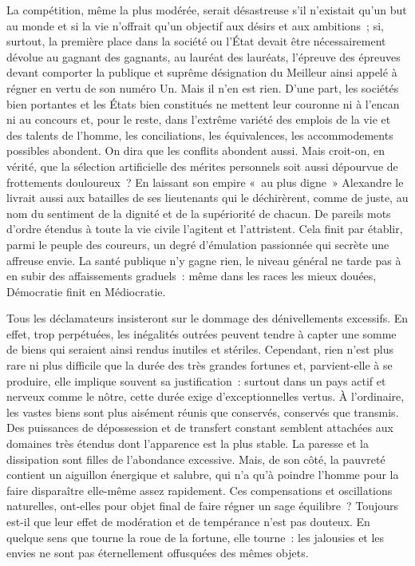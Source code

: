 \documentclass[french,twoside]{book} %
\begin{document}
La compétition, même la plus modérée, serait désastreuse s’il n’existait qu’un but au monde et si la vie n’offrait qu’un objectif aux désirs et aux ambitions ; si, surtout, la première place dans la société ou l’État devait être nécessairement dévolue au gagnant des gagnants, au lauréat des lauréats, l’épreuve des épreuves devant comporter la publique et suprême désignation du Meilleur ainsi appelé à régner en vertu de son numéro Un. Mais il n’en est rien. D’une part, les sociétés bien portantes et les États bien constitués ne mettent leur couronne ni à l’encan ni au concours et, pour le reste, dans l’extrême variété des emplois de la vie et des talents de l’homme, les conciliations, les équivalences, les accommodements possibles abondent. On dira que les conflits abondent aussi. Mais croit-on, en vérité, que la sélection artificielle des mérites personnels soit aussi dépourvue de frottements douloureux ? En laissant son empire « au plus digne » Alexandre le livrait aussi aux batailles de ses lieutenants qui le déchirèrent, comme de juste, au nom du sentiment de la dignité et de la supériorité de chacun. De pareils mots d’ordre étendus à toute la vie civile l’agitent et l’attristent. Cela finit par établir, parmi le peuple des coureurs, un degré d’émulation passionnée qui secrète une affreuse envie. La santé publique n’y gagne rien, le niveau général ne tarde pas à en subir des affaissements graduels : même dans les races les mieux douées, Démocratie finit en Médiocratie.\par
Tous les déclamateurs insisteront sur le dommage des dénivellements excessifs. En effet, trop perpétuées, les inégalités outrées peuvent tendre à capter une somme de biens qui seraient ainsi rendus inutiles et stériles. Cependant, rien n’est plus rare ni plus difficile que la durée des très grandes fortunes et, parvient-elle à se produire, elle implique souvent sa justification : surtout dans un pays actif et nerveux comme le nôtre, cette durée exige d’exceptionnelles vertus. À l’ordinaire, les vastes biens sont plus aisément réunis que conservés, conservés que transmis. Des puissances de dépossession et de transfert constant semblent attachées aux domaines très étendus dont l’apparence est la plus stable. La paresse et la dissipation sont filles de l’abondance excessive. Mais, de son côté, la pauvreté contient un aiguillon énergique et salubre, qui n’a qu’à poindre l’homme pour la faire disparaître elle-même assez rapidement. Ces compensations et oscillations naturelles, ont-elles pour objet final de faire régner un sage équilibre ? Toujours est-il que leur effet de modération et de tempérance n’est pas douteux. En quelque sens que tourne la roue de la fortune, elle tourne : les jalousies et les envies ne sont pas éternellement offusquées des mêmes objets.\par
\end{document}
